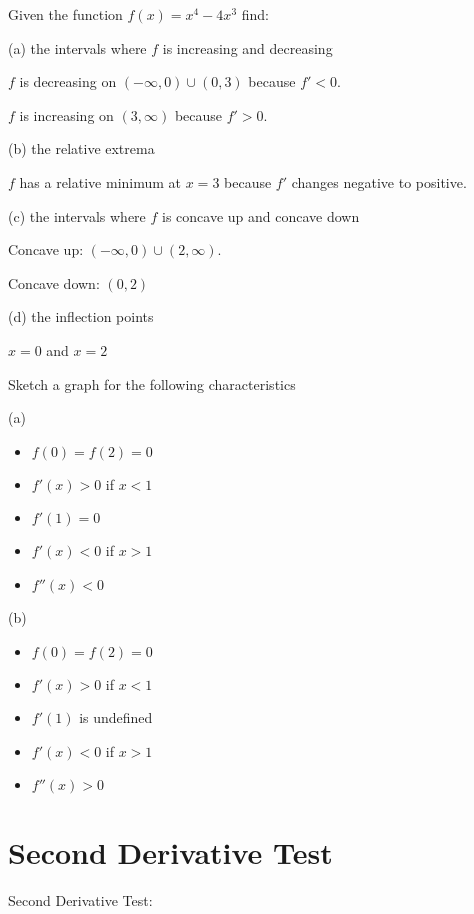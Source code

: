 \documentclass[../bccalc.tex]{subfiles}
\begin{document}
\begin{example}
    Given the function $f(x)=x^4-4x^3$ find:

    (a) the intervals where $f$ is increasing and decreasing 

    $f$ is decreasing on $(-\infty,0)\cup (0,3)$ because $f'<0$.

    $f$ is increasing on $(3,\infty)$ because $f'>0$.

    (b) the relative extrema 

    $f$ has a relative minimum at $x=3$ because $f'$ changes negative to positive.

    (c) the intervals where $f$ is concave up and concave down 

    Concave up: $(-\infty,0)\cup (2,\infty)$.

    Concave down: $(0,2)$

    (d) the inflection points 

    $x=0$ and $x=2$
\end{example}

\ex Sketch a graph for the following characteristics

(a)
\begin{itemize}
    \item $f(0)=f(2)=0$
    \item $f'(x)>0$ if $x<1$
    \item $f'(1)=0$
    \item $f'(x)<0$ if $x>1$
    \item $f''(x)<0$
\end{itemize}

(b)
\begin{itemize}
    \item $f(0)=f(2)=0$
    \item $f'(x)>0$ if $x<1$
    \item $f'(1)$ is undefined 
    \item $f'(x)<0$ if $x>1$
    \item $f''(x)>0$
\end{itemize}


\section{Second Derivative Test}
Second Derivative Test:
\end{document}
